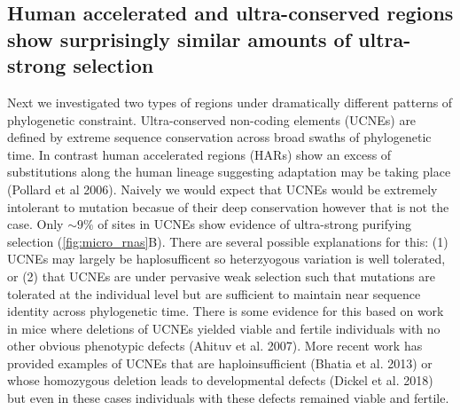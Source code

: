 \documentclass[11pt]{article}
\begin{document}

\subsection*{Human accelerated and ultra-conserved regions show surprisingly similar amounts of ultra-strong selection}

Next we investigated two types of regions under dramatically different patterns of phylogenetic constraint. Ultra-conserved non-coding elements (UCNEs) are defined by extreme sequence conservation across broad swaths of phylogenetic time. In contrast human accelerated regions (HARs) show an excess of substitutions along the human lineage suggesting adaptation may be taking place (Pollard et al 2006). Naively we would expect that UCNEs would be extremely intolerant to mutation becasue of their deep conservation however that is not the case. Only $\sim 9\%$ of sites in UCNEs show evidence of ultra-strong purifying selection (\ref{fig:micro_rnas}B). There are several possible explanations for this: (1) UCNEs may largely be haplosufficent so heterzyogous variation is well tolerated, or (2) that UCNEs are under pervasive weak selection such that mutations are tolerated at the individual level but are sufficient to maintain near sequence identity across phylogenetic time. There is some evidence for this based on work in mice where deletions of UCNEs yielded viable and fertile individuals with no other obvious phenotypic defects (Ahituv et al. 2007). More recent work has provided examples of UCNEs that are haploinsufficient (Bhatia et al. 2013) or whose homozygous deletion leads to developmental defects (Dickel et al. 2018) but even in these cases individuals with these defects remained viable and fertile.
\end{document}
